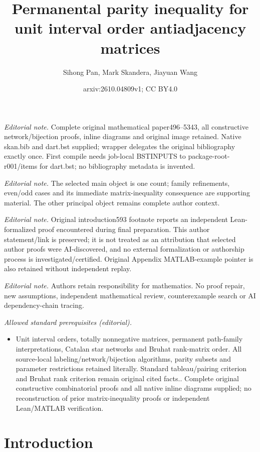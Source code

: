 \documentclass[12pt]{amsart}
\title{Permanental parity inequality for unit interval order antiadjacency matrices}
\author{Sihong Pan, Mark Skandera, Jiayuan Wang}
\date{arxiv:2610.04809v1; CC BY4.0}
\theoremstyle{definition}
\numberwithin{equation}{section}
\begin{document}
\maketitle
\noindent\textit{Editorial note.} Complete original mathematical paper496--5343, all constructive network/bijection proofs, inline diagrams and original image retained. Native skan.bib and dart.bst supplied; wrapper delegates the original bibliography exactly once. First compile needs job-local BSTINPUTS to package-root-r001/items for dart.bst; no bibliography metadata is invented.\par\medskip
\noindent\textit{Editorial note.} The selected main object is one count; family refinements, even/odd cases and its immediate matrix-inequality consequence are supporting material. The other principal object remains complete author context.\par\medskip
\noindent\textit{Editorial note.} Original introduction593 footnote reports an independent Lean-formalized proof encountered during final preparation. This author statement/link is preserved; it is not treated as an attribution that selected author proofs were AI-discovered, and no external formalization or authorship process is investigated/certified. Original Appendix MATLAB-example pointer is also retained without independent replay.\par\medskip
\noindent\textit{Editorial note.} Authors retain responsibility for mathematics. No proof repair, new assumptions, independent mathematical review, counterexample search or AI dependency-chain tracing.\par\medskip
\noindent\textit{Allowed standard prerequisites (editorial).}\begin{itemize}
\item Unit interval orders, totally nonnegative matrices, permanent path-family interpretations, Catalan star networks and Bruhat rank-matrix order. All source-local labeling/network/bijection algorithms, parity subsets and parameter restrictions retained literally. Standard tableau/pairing criterion and Bruhat rank criterion remain original cited facts.. Complete original constructive combinatorial proofs and all native inline diagrams supplied; no reconstruction of prior matrix-inequality proofs or independent Lean/MATLAB verification.
\end{itemize}\medskip
\section{Introduction}\label{s:intro}
\end{document}
